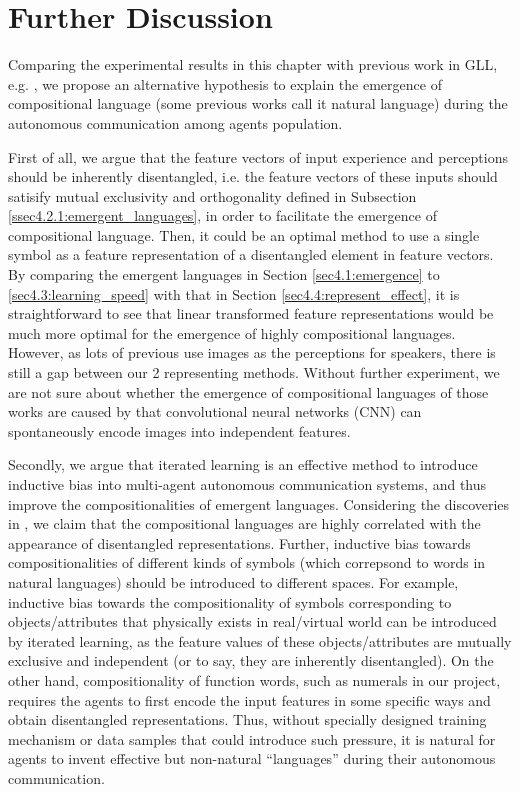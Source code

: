 \section{Further Discussion}
\label{sec4.5:discuss}

Comparing the experimental results in this chapter with previous work in GLL, e.g. \cite{kottur2017natural, hermann2017grounded, havrylov2017emergence, mordatch2018emergence}, we propose an alternative hypothesis to explain the emergence of compositional language (some previous works call it natural language) during the autonomous communication among agents population.

First of all, we argue that the feature vectors of input experience and perceptions should be inherently disentangled, i.e. the feature vectors of these inputs should satisify mutual exclusivity and orthogonality defined in Subsection \ref{ssec4.2.1:emergent_languages}, in order to facilitate the emergence of compositional language. Then, it could be an optimal method to use a single symbol as a feature representation of a disentangled element in feature vectors. By comparing the emergent languages in Section \ref{sec4.1:emergence} to \ref{sec4.3:learning_speed} with that in Section \ref{sec4.4:represent_effect}, it is straightforward to see that linear transformed feature representations would be much more optimal for the emergence of highly compositional languages. However, as lots of previous use images as the perceptions for speakers, there is still a gap between our 2 representing methods. Without further experiment, we are not sure about whether the emergence of compositional languages of those works are caused by that convolutional neural networks (CNN) can spontaneously encode images into independent features.

Secondly, we argue that iterated learning is an effective method to introduce inductive bias into multi-agent autonomous communication systems, and thus improve the compositionalities of emergent languages. Considering the discoveries in \cite{locatello2018challenging}, we claim that the compositional languages are highly correlated with the appearance of disentangled representations. Further, inductive bias towards compositionalities of different kinds of symbols (which correpsond to words in natural languages) should be introduced to different spaces. For example, inductive bias towards the compositionality of symbols corresponding to objects/attributes that physically exists in real/virtual world can be introduced by iterated learning, as the feature values of these objects/attributes are mutually exclusive and independent (or to say, they are inherently disentangled). On the other hand, compositionality of function words, such as numerals in our project, requires the agents to first encode the input features in some specific ways and obtain disentangled representations. Thus, without specially designed training mechanism or data samples that could introduce such pressure, it is natural for agents to invent effective but non-natural ``languages'' during their autonomous communication.